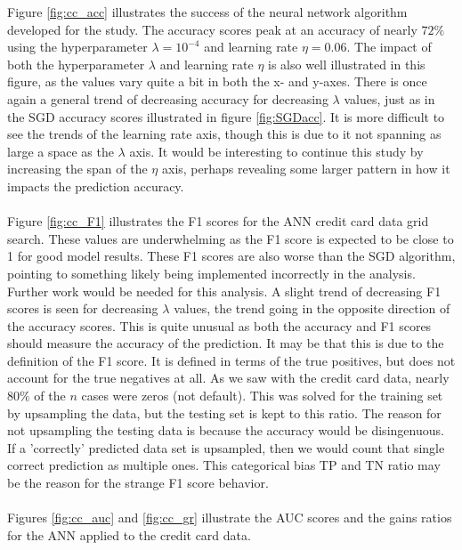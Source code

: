         Figure \ref{fig:cc_acc} illustrates the success of the neural network algorithm developed for the study. The accuracy scores peak at an accuracy of nearly $72\%$ using the hyperparameter $\lambda = 10^{-4}$ and learning rate $\eta = 0.06$. The impact of both the hyperparameter $\lambda$ and learning rate $\eta$ is also well illustrated in this figure, as the values vary quite a bit in both the x- and y-axes. There is once again a general trend of decreasing accuracy for decreasing $\lambda$ values, just as in the SGD accuracy scores illustrated in figure \ref{fig:SGDacc}. It is more difficult to see the trends of the learning rate axis, though this is due to it not spanning as large a space as the $\lambda$ axis. It would be interesting to continue this study by increasing the span of the $\eta$ axis, perhaps revealing some larger pattern in how it impacts the prediction accuracy.\\\\ 
        Figure \ref{fig:cc_F1} illustrates the F1 scores for the ANN credit card data grid search. These values are underwhelming as the F1 score is expected to be close to 1 for good model results. These F1 scores are also worse than the SGD algorithm, pointing to something likely being implemented incorrectly in the analysis. Further work would be needed for this analysis. A slight trend of decreasing F1 scores is seen for decreasing $\lambda$ values, the trend going in the opposite direction of the accuracy scores. This is quite unusual as both the accuracy and F1 scores should measure the accuracy of the prediction. It may be that this is due to the definition of the F1 score. It is defined in terms of the true positives, but does not account for the true negatives at all. As we saw with the credit card data, nearly $80\%$ of the $n$ cases were zeros (not default). This was solved for the training set by upsampling the data, but the testing set is kept to this ratio. The reason for not upsampling the testing data is because the accuracy would be disingenuous. If a 'correctly' predicted data set is upsampled, then we would count that single correct prediction as multiple ones. This categorical bias TP and TN ratio may be the reason for the strange F1 score behavior.\\\\
        Figures \ref{fig:cc_auc} and \ref{fig:cc_gr} illustrate the AUC scores and the gains ratios for the ANN applied to the credit card data. 
   
